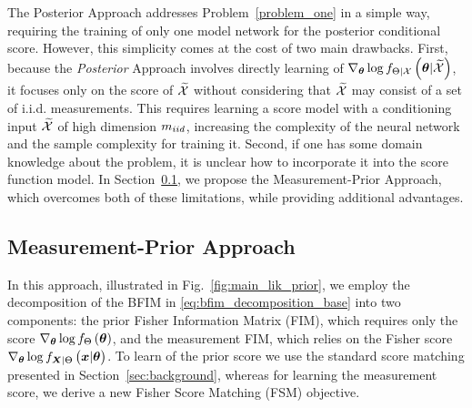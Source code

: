 {The Posterior Approach addresses Problem~\ref{problem_one} in a simple way, requiring the training of only one model network for the posterior conditional score. However, this simplicity comes at the cost of two main drawbacks.} 
{First, because
}
the \emph{Posterior} Approach involves directly learning of $\nabla_{\bm{\theta}}\log f_{\Theta|\mathcal{X}}\left(\bm{\theta}|\widetilde{\mathcal{X}}\right)$, it focuses only on the score of $\widetilde{\mathcal{X}}$ without considering that $\widetilde{\mathcal{X}}$ may consist of a set of i.i.d. measurements.  This %
requires learning  {a score model with a  conditioning input $\widetilde{\mathcal{X}}$ of high dimension $m_{iid}$, increasing the complexity of the neural network and the sample complexity for training it}. {Second}, if one has {some domain}  knowledge about the problem, it is unclear how to incorporate it into the score function model. In Section~\ref{sec:lik_learn}, we propose the Measurement-Prior Approach, which
{ overcomes both of these limitations, while providing additional advantages.}
\subsection{Measurement-Prior Approach}\label{sec:lik_learn}


%
{%
In this approach, illustrated
in Fig.~\ref{fig:main_lik_prior},
}
we employ the decomposition of the BFIM 
in \eqref{eq:bfim_decomposition_base} %
into two components: the prior Fisher Information Matrix (FIM), which requires only the score $\nabla_{\bm{\theta}}\log f_{\Theta}\left(\bm{\theta}\right)$, and the measurement FIM, which relies on the Fisher score $\nabla_{\p}\log\probt{{\x}|\p}{{\X}|\pr}$.
To learn of the prior score we use the standard score matching presented in Section~\ref{sec:background}, whereas for learning the measurement score, we derive a new Fisher Score Matching (FSM) objective.

